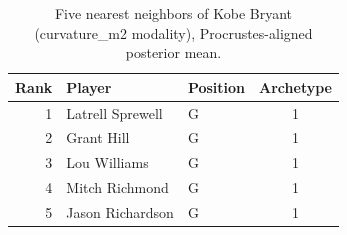 \begin{table}[htbp]
  \centering\small
  \begin{tabular}{rllc}
    \toprule
    Rank & Player & Position & Archetype \\
    \midrule
    1 & Latrell Sprewell & G & 1 \\
    2 & Grant Hill & G & 1 \\
    3 & Lou Williams & G & 1 \\
    4 & Mitch Richmond & G & 1 \\
    5 & Jason Richardson & G & 1 \\
    \bottomrule
  \end{tabular}
  \caption{Five nearest neighbors of Kobe Bryant (curvature_m2 modality), Procrustes-aligned posterior mean.}
  \label{tab:Kobe_Bryant_neighbors_curvature_m2}
\end{table}

